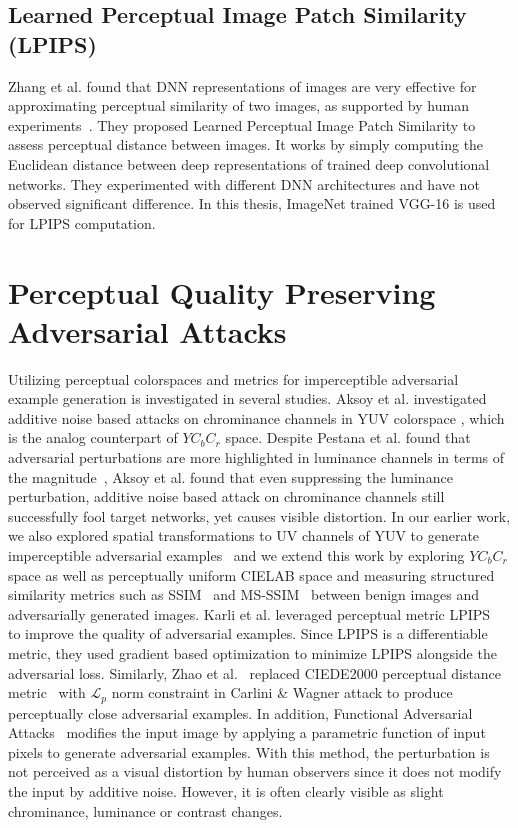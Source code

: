 \subsection{Learned Perceptual Image Patch Similarity (LPIPS)}
Zhang et al. found that DNN representations of images are very effective for approximating perceptual similarity of two images, as supported by human experiments~\cite{zhang2018unreasonable}. They proposed Learned Perceptual Image Patch Similarity to assess perceptual distance between images. It works by simply computing the Euclidean distance between deep representations of trained deep convolutional networks. They experimented with different DNN architectures and have not observed significant difference. In this thesis, ImageNet trained VGG-16 is used for LPIPS computation.

\section{Perceptual Quality Preserving Adversarial Attacks}

Utilizing perceptual colorspaces and metrics for imperceptible adversarial example generation is investigated in several studies. Aksoy et al. investigated additive noise based attacks on chrominance channels in YUV colorspace \cite{aksoy2019attack}, which is the analog counterpart of \(YC_{b}C_{r}\) space. Despite Pestana et al. found that adversarial perturbations are more highlighted in luminance channels in terms of the magnitude~\cite{Pestana2020-hm}, Aksoy et al. found that even suppressing the luminance perturbation, additive noise based attack on chrominance channels still successfully fool target networks, yet causes visible distortion. In our earlier work, we also explored spatial transformations to UV channels of YUV to generate imperceptible adversarial examples~\cite{aydin2019imperceptible} and we extend this work by exploring \(YC_{b}C_{r}\) space as well as perceptually uniform CIELAB space and measuring structured similarity metrics such as SSIM~\cite{wang2004image} and MS-SSIM~\cite{wang2003multiscale} between benign images and adversarially generated images. Karli et al. leveraged perceptual metric LPIPS~\cite{zhang2018unreasonable} to improve the quality of adversarial examples. Since LPIPS is a differentiable metric, they used gradient based optimization to minimize LPIPS alongside the adversarial loss. Similarly, Zhao et al.~\cite{zhao2020large} replaced CIEDE2000 perceptual distance metric~\cite{luo2001development} with \(\mathcal{L}_{p}\) norm constraint in Carlini \& Wagner attack to produce perceptually close adversarial examples. In addition, Functional Adversarial Attacks~\cite{laidlaw2019functional} modifies the input image by applying a parametric function of input pixels to generate adversarial examples. With this method, the perturbation is not perceived as a visual distortion by human observers since it does not modify the input by additive noise. However, it is often clearly visible as slight chrominance, luminance or contrast changes.

